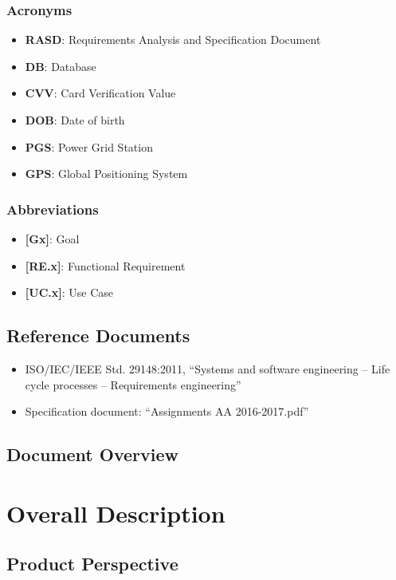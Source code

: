 \documentclass[english]{article}
\begin{document}
\subsubsection{Acronyms}
\begin{itemize}
\item{\textbf{RASD}: Requirements Analysis and Specification Document}
\item{\textbf{DB}: Database}
\item{\textbf{CVV}: Card Verification Value}
\item{\textbf{DOB}: Date of birth}
\item{\textbf{PGS}: Power Grid Station}
\item{\textbf{GPS}: Global Positioning System}
\end{itemize}

\subsubsection{Abbreviations}
\begin{itemize}
\item{\textbf{[Gx]}: Goal}
\item{\textbf{[RE.x]}: Functional Requirement}
\item{\textbf{[UC.x]}: Use Case}
\end{itemize}

\subsection{Reference Documents}

\begin{itemize}
	\item{ISO/IEC/IEEE Std. 29148:2011, “Systems and software engineering -- Life cycle processes -- Requirements engineering”}
	\item{Specification document: “Assignments AA 2016-2017.pdf”}
\end{itemize}

\subsection{Document Overview}

\newpage{}

\section{Overall Description}

\subsection{Product Perspective}
\end{document}
